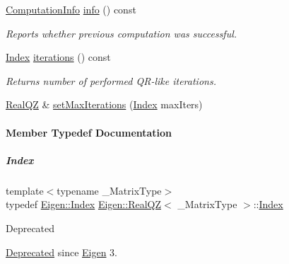 \begin{DoxyCompactItemize}
\hyperlink{group__enums_ga85fad7b87587764e5cf6b513a9e0ee5e}{Computation\+Info} \hyperlink{group___eigenvalues___module_a36bd77afed89f3f5c110a715e69e4c64}{info} () const
\begin{DoxyCompactList}\small\item\em Reports whether previous computation was successful. \end{DoxyCompactList}\item 
\mbox{\label{group___eigenvalues___module_afbecc6d0ab1de42be9db79428da48ab6}} 
\hyperlink{group___eigenvalues___module_a6201e534e901b5f4e66f72c176b534a3}{Index} \hyperlink{group___eigenvalues___module_afbecc6d0ab1de42be9db79428da48ab6}{iterations} () const
\begin{DoxyCompactList}\small\item\em Returns number of performed Q\+R-\/like iterations. \end{DoxyCompactList}\item 
\hyperlink{group___eigenvalues___module_class_eigen_1_1_real_q_z}{Real\+QZ} \& \hyperlink{group___eigenvalues___module_a30ae65666b1757e4a2b6a28eaec12226}{set\+Max\+Iterations} (\hyperlink{group___eigenvalues___module_a6201e534e901b5f4e66f72c176b534a3}{Index} max\+Iters)
\end{DoxyCompactItemize}


\paragraph{Member Typedef Documentation}
\mbox{\label{group___eigenvalues___module_a6201e534e901b5f4e66f72c176b534a3}} 
\subparagraph{\texorpdfstring{Index}{Index}\hspace{0.1cm}{\footnotesize\ttfamily [1/2]}}
{\footnotesize\ttfamily template$<$typename \+\_\+\+Matrix\+Type$>$ \\
typedef \hyperlink{namespace_eigen_a62e77e0933482dafde8fe197d9a2cfde}{Eigen\+::\+Index} \hyperlink{group___eigenvalues___module_class_eigen_1_1_real_q_z}{Eigen\+::\+Real\+QZ}$<$ \+\_\+\+Matrix\+Type $>$\+::\hyperlink{group___eigenvalues___module_a6201e534e901b5f4e66f72c176b534a3}{Index}}

\begin{DoxyRefDesc}{Deprecated}
\item[\hyperlink{deprecated__deprecated000021}{Deprecated}]since \hyperlink{namespace_eigen}{Eigen} 3. \end{DoxyRefDesc}


